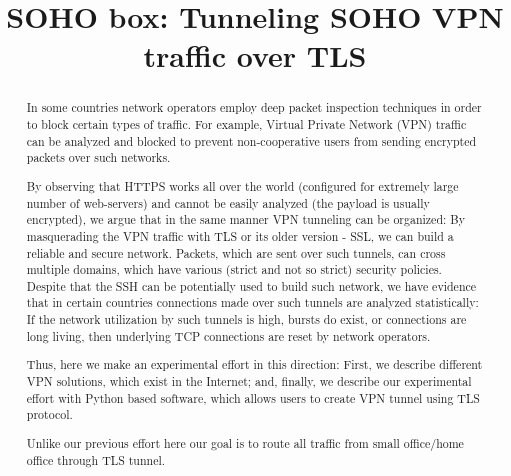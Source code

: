 \documentclass[conference,10pt,letter]{IEEEtran}
\begin{document}
\sloppy
\title{SOHO box: Tunneling SOHO VPN traffic over TLS}
\maketitle
\begin{abstract}

In some countries network operators employ deep packet inspection techniques 
in order to block certain types of traffic. For example, Virtual Private Network 
(VPN) traffic can be analyzed and blocked to prevent non-cooperative users from 
sending encrypted packets over such networks. 

By observing that HTTPS works all over the world (configured for extremely large
number of web-servers) and cannot be easily analyzed (the payload is usually encrypted),
we argue that in the same manner VPN tunneling can be organized: By masquerading 
the VPN traffic with TLS or its older version - SSL, we can build a reliable and 
secure network. Packets, which are sent over such tunnels, can cross multiple
domains, which have various (strict and not so strict) security policies. 
Despite that the SSH can be potentially used to build such network, 
we have evidence that in certain countries connections
made over such tunnels are analyzed statistically: If the network utilization by 
such tunnels is high, bursts do exist, or connections are long living, then 
underlying TCP connections are reset by network operators. 

Thus, here we make an experimental effort in this direction: 
First, we describe different VPN solutions, which exist in the Internet; 
and, finally, we describe our experimental effort with Python based software,
which allows users to create VPN tunnel using TLS protocol. 

Unlike our previous effort here our goal is to route all traffic from small
office/home office through TLS tunnel.

\end{abstract}







\end{document}

